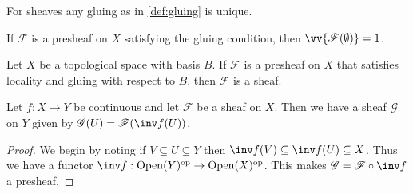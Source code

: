\documentclass{article}
\begin{document}
\begin{theorem}
  For sheaves any gluing as in \ref{def:gluing} is unique.
\end{theorem}

\begin{corollary}
  If $\mathscr F$ is a presheaf on $X$ satisfying the gluing
  condition, then $\vv{\mathscr F(\emptyset)}=1$.
\end{corollary}


\begin{lemma}\label{lemma:axioms_on_basis}
  Let $X$ be a topological space with basis $B$. If $\mathscr F$
  is a presheaf on $X$ that satisfies locality and gluing with respect
  to $B$, then $\mathscr F$ is a sheaf.
\end{lemma}

\begin{example}
  Let $f:X\to Y$ be continuous and let $\mathscr F$ be a sheaf on $X$.
  Then we have a sheaf $\mathscr G$ on $Y$ given by
  $\mathscr G(U) = \mathscr F(\inv f(U))$.
  \begin{proof}
    We begin by noting if $V\subseteq U\subseteq Y$ then
    $\inv f(V)\subseteq\inv f(U)\subseteq X$. Thus we have a
    functor $\inv f:\Open(Y)^{\text{op}}\to\Open(X)^{\text{op}}$.
    This makes $\mathscr G = \mathscr F \circ \inv f$ a presheaf.


\end{proof}
\end{example}
\end{document}
